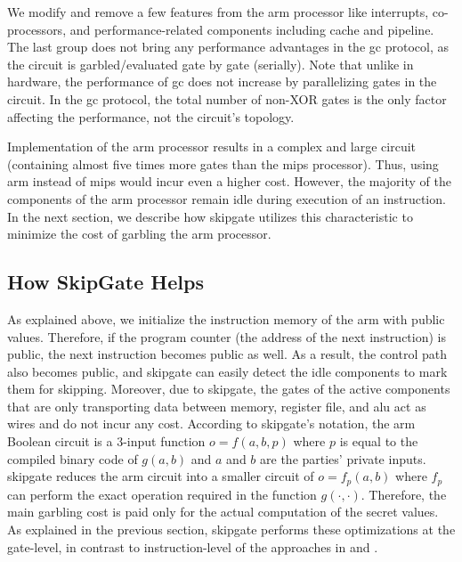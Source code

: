 We modify and remove a few features from the \gls{arm} processor like interrupts, co-processors, and performance-related components including cache and pipeline.
The last group does not bring any performance advantages in the \acrshort{gc} protocol, as the circuit is garbled/evaluated gate by gate (serially).
Note that unlike in hardware, the performance of \acrshort{gc} does not increase by parallelizing gates in the circuit.
In the \acrshort{gc} protocol, the total number of non-XOR gates is the only factor affecting the performance, not the circuit's topology.

Implementation of the \gls{arm} processor results in a complex and large circuit (containing almost five times more gates than the \gls{mips} processor).
Thus, using \gls{arm} instead of \gls{mips} would incur even a higher cost.
However, the majority of the components of the \gls{arm} processor remain idle during  execution of an instruction.
In the next section, we describe how \gls{skipgate} utilizes this characteristic to minimize the cost of garbling the \gls{arm} processor.

\subsection{How {SkipGate} Helps}
As explained above, we initialize the instruction memory of the \gls{arm} with public values.
Therefore, if the program counter (the address of the next instruction) is public, the next instruction becomes public as well.
As a result, the control path also becomes public, and \gls{skipgate} can easily detect the idle components to mark them for skipping.
Moreover, due to \gls{skipgate}, the gates of the active components that are only transporting data between memory, register file, and \acrshort{alu} act as wires and do not incur any cost.
According to \gls{skipgate}'s notation, the \gls{arm} Boolean circuit is a 3-input function $o = f(a,b,p)$ where $p$ is equal to the compiled binary code of $g(a,b)$ and $a$ and $b$ are the parties' private inputs.
\gls{skipgate} reduces the \gls{arm} circuit into a smaller circuit of $o = f_p(a,b)$ where $f_p$ can perform the exact operation required in the function $g(\cdot,\cdot)$.
Therefore, the main garbling cost is paid only for the actual computation of the secret values.
As explained in the previous section, \gls{skipgate} performs these optimizations at the gate-level, in contrast to instruction-level of the approaches in  and \cite{wang2016secure}.

